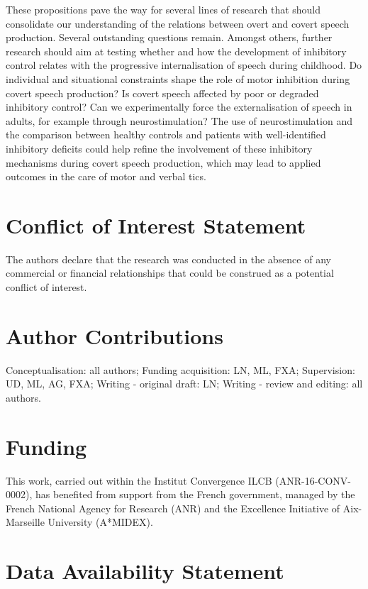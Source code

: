 \documentclass[utf8]{template/frontiersSCNS} %
\begin{document}
These propositions pave the way for several lines of research that should consolidate our understanding of the relations between overt and covert speech production. Several outstanding questions remain. Amongst others, further research should aim at testing whether and how the development of inhibitory control relates with the progressive internalisation of speech during childhood. Do individual and situational constraints shape the role of motor inhibition during covert speech production? Is covert speech affected by poor or degraded inhibitory control? Can we experimentally force the externalisation of speech in adults, for example through neurostimulation? The use of neurostimulation and the comparison between healthy controls and patients with well-identified inhibitory deficits could help refine the involvement of these inhibitory mechanisms during covert speech production, which may lead to applied outcomes in the care of motor and verbal tics.

\section*{Conflict of Interest Statement}

The authors declare that the research was conducted in the absence of any commercial or financial relationships that could be construed as a potential conflict of interest.

\section*{Author Contributions}

Conceptualisation: all authors; Funding acquisition: LN, ML, FXA; Supervision: UD, ML, AG, FXA; Writing - original draft: LN; Writing - review and editing: all authors.

\section*{Funding}

This work, carried out within the Institut Convergence ILCB (ANR-16-CONV-0002), has benefited from support from the French government, managed by the French National Agency for Research (ANR) and the Excellence Initiative of Aix-Marseille University (A*MIDEX).

\section*{Data Availability Statement}
\end{document}

